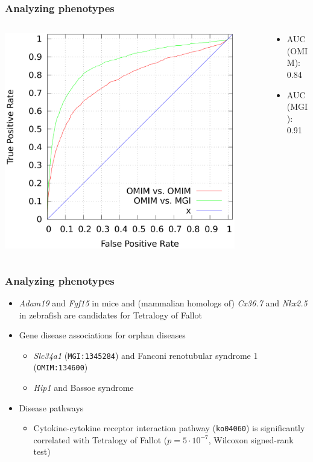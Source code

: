 \documentclass{beamer}
\renewcommand{\em}{\itshape}
\begin{document}
\begin{frame}
  \frametitle{Analyzing phenotypes}
  \begin{columns}
    \begin{column}{7cm}
      \centerline{\includegraphics[width=0.9\textwidth]{roc-omim-mgi-1.png}}
    \end{column}
    \begin{column}{4cm}
      \begin{itemize}
      \item AUC (OMIM): 0.84
      \item AUC (MGI): 0.91
      \end{itemize}
    \end{column}
  \end{columns}
\end{frame}

\begin{frame}
  \frametitle{Analyzing phenotypes}
  \begin{itemize}
  \item {\em Adam19} and {\em Fgf15} in mice and (mammalian homologs
    of) {\em Cx36.7} and {\em Nkx2.5} in zebrafish are candidates for
    Tetralogy of Fallot
  \item Gene disease associations for orphan diseases
    \begin{itemize}
    \item {\em Slc34a1} ({\tt MGI:1345284}) and Fanconi renotubular
      syndrome 1 ({\tt OMIM:134600})
    \item {\em Hip1} and Bassoe syndrome
    \end{itemize}
  \item Disease pathways
    \begin{itemize}
    \item Cytokine-cytokine receptor interaction pathway ({\tt ko04060})
      is significantly correlated with Tetralogy of Fallot ($p=5\cdot
      10^{-7}$, Wilcoxon signed-rank test)
    \end{itemize}
  \end{itemize}
\end{frame}
\end{document}
